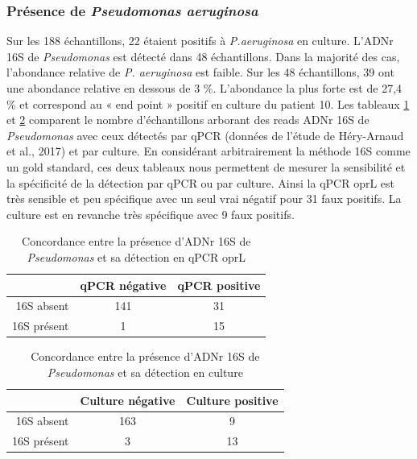 \documentclass[12pt,a4paper]{article}
\begin{document}
\subsubsection{Présence de \textit{Pseudomonas aeruginosa}}
Sur les 188 échantillons, 22 étaient positifs à \textit{P.aeruginosa} en culture. L'ADNr 16S de \textit{Pseudomonas} est détecté dans 48 échantillons. Dans la majorité des cas, l'abondance relative de \textit{P. aeruginosa} est faible. Sur les 48 échantillons, 39 ont une abondance relative en dessous de 3 \%. L'abondance la plus forte est de 27,4 \% et correspond au « end point » positif en culture du patient 10.
Les tableaux \ref{pyopcr} et \ref{pyoculture} comparent le nombre d'échantillons arborant des reads ADNr 16S de \textit{Pseudomonas} avec ceux détectés par qPCR (données de l'étude de Héry-Arnaud et al., 2017\cite{Hery-Arnaud2017}) et par culture. 
En considérant arbitrairement la méthode 16S comme un gold standard, ces deux tableaux nous permettent de mesurer la sensibilité et la spécificité de la détection par qPCR ou par culture. 
Ainsi la qPCR oprL est très sensible et peu spécifique  avec un seul vrai négatif pour 31 faux positifs. 
La culture est en revanche très spécifique avec 9 faux positifs. 

  \begin{table}[!h]
      \centering
            \caption{Concordance entre la présence d'ADNr 16S de \textit{Pseudomonas} et sa détection en qPCR oprL}

      \begin{tabular}{r|c|c}
           & qPCR négative  & qPCR positive \\
           \hline
           16S absent & 141 & 31 \\
           16S présent & 1 & 15   \\

      \end{tabular}
      \label{pyopcr}
  \end{table}

  \begin{table}[!h]
      \centering
         \caption{Concordance entre la présence d'ADNr 16S de \textit{Pseudomonas} et sa détection en culture}
      \begin{tabular}{r|c|c}
           & Culture négative  & Culture positive \\
           \hline
           16S absent & 163 & 9 \\
           16S présent & 3 & 13   \\
      \end{tabular}
   
      \label{pyoculture}
  \end{table}
\end{document}
